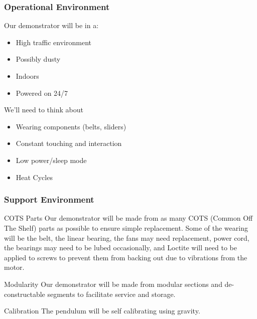 \documentclass[aspectratio=169]{beamer}
\begin{document}
\begin{frame}
    \frametitle{Operational Environment}

    Our demonstrator will be in a:
    \begin{itemize}
        \item High traffic environment
        \item Possibly dusty
        \item Indoors
        \item Powered on 24/7
    \end{itemize}

    We'll need to think about

    \begin{itemize}
        \item Wearing components (belts, sliders)
        \item Constant touching and interaction
        \item Low power/sleep mode
        \item Heat Cycles
    \end{itemize}

\end{frame}


\begin{frame}
    \frametitle{Support Environment}

    \begin{block}{COTS Parts}
        Our demonstrator will be made from as many COTS (Common Off The Shelf) parts
        as possible to ensure simple replacement.
        Some of the wearing will be the belt, the linear bearing, the fans may need replacement, power cord, the bearings may need to be lubed occasionally, and Loctite will need to be applied to screws to prevent them from backing out due to vibrations from the motor.
    \end{block}

    \begin{block}{Modularity}
        Our demonstrator will be made from modular sections and de-constructable segments
        to facilitate service and storage.
    \end{block}

    \begin{block}{Calibration}
        The pendulum will be self calibrating using gravity.
    \end{block}

\end{frame}
\end{document}
